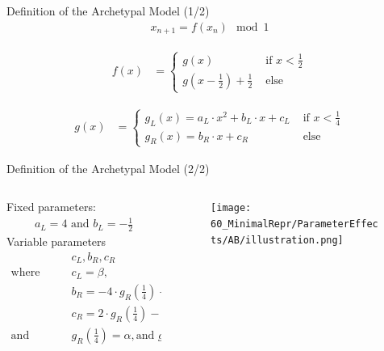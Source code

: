 \begin{frame}{Definition of the Archetypal Model (1/2)}
	\vspace{-3.0em}
	\begin{align}
		x_{n+1} = f(x_n) \mod 1
	\end{align}

	\begin{align}
		f(x) & = \begin{cases}
			         g(x)                                        & \text{ if } x < \frac{1}{2} \\
			         g\left(x - \frac{1}{2}\right) + \frac{1}{2} & \text{ else}
		         \end{cases}
	\end{align}

	\begin{align}
		g(x) & = \begin{cases}
			         g_L(x) = a_L \cdot x^2 + b_L \cdot x + c_L & \text{ if } x < \frac{1}{4} \\
			         g_R(x) = b_R \cdot x + c_R                 & \text{ else}
		         \end{cases}
	\end{align}
\end{frame}

\begin{frame}{Definition of the Archetypal Model (2/2)}
	\vspace{-1.5em}
	\begin{columns}
		\begin{column}{.7 \textwidth}
			Fixed parameters:
			\begin{align*}
				a_L = 4 \text{ and } b_L = -\frac{1}{2}
			\end{align*}
			Variable parameters
			\begin{align*}
				 & c_L, b_R, c_R                                                                                                           \\
				\text{where} \qquad
				 & c_L = \beta,                                                                                                            \\
				 & b_R = -4 \cdot g_R\left(\frac{1}{4}\right) + 4 \cdot g_R\left(\frac{1}{2}\right),                                       \\
				 & c_R = 2 \cdot g_R\left(\frac{1}{4}\right) - 1 \cdot g_R\left(\frac{1}{2}\right),                                        \\
				\text{and} \qquad
				 & g_R\left(\frac{1}{4}\right) = \alpha, \text{and } g_R\left(\frac{1}{2}\right) = \frac{1}{2} + \epsilon \text{ is fixed}
			\end{align*}
		\end{column}
		\begin{column}{.3 \textwidth}
			\begin{figure}
				\centering
				\texttt{[image: 60\_MinimalRepr/ParameterEffects/AB/illustration.png]}
			\end{figure}
		\end{column}
	\end{columns}
\end{frame}

